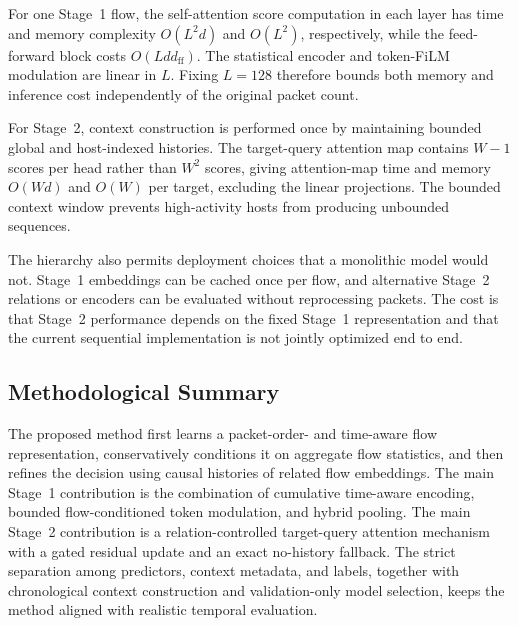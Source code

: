 For one Stage~1 flow, the self-attention score computation in each layer has
time and memory complexity $O(L^2d)$ and $O(L^2)$, respectively, while the
feed-forward block costs $O(Ld d_{\mathrm{ff}})$. The statistical encoder and
token-FiLM modulation are linear in $L$. Fixing $L=128$ therefore bounds both
memory and inference cost independently of the original packet count.

For Stage~2, context construction is performed once by maintaining bounded
global and host-indexed histories. The target-query attention map contains
$W-1$ scores per head rather than $W^2$ scores, giving attention-map time and
memory $O(Wd)$ and $O(W)$ per target, excluding the linear projections. The
bounded context window prevents high-activity hosts from producing unbounded
sequences.

The hierarchy also permits deployment choices that a monolithic model would
not. Stage~1 embeddings can be cached once per flow, and alternative Stage~2
relations or encoders can be evaluated without reprocessing packets. The cost
is that Stage~2 performance depends on the fixed Stage~1 representation and
that the current sequential implementation is not jointly optimized end to end.

\subsection{Methodological Summary}
\label{subsec:method_summary}

The proposed method first learns a packet-order- and time-aware flow
representation, conservatively conditions it on aggregate flow statistics, and
then refines the decision using causal histories of related flow embeddings.
The main Stage~1 contribution is the combination of cumulative time-aware
encoding, bounded flow-conditioned token modulation, and hybrid pooling. The
main Stage~2 contribution is a relation-controlled target-query attention
mechanism with a gated residual update and an exact no-history fallback. The
strict separation among predictors, context metadata, and labels, together
with chronological context construction and validation-only model selection,
keeps the method aligned with realistic temporal evaluation.
